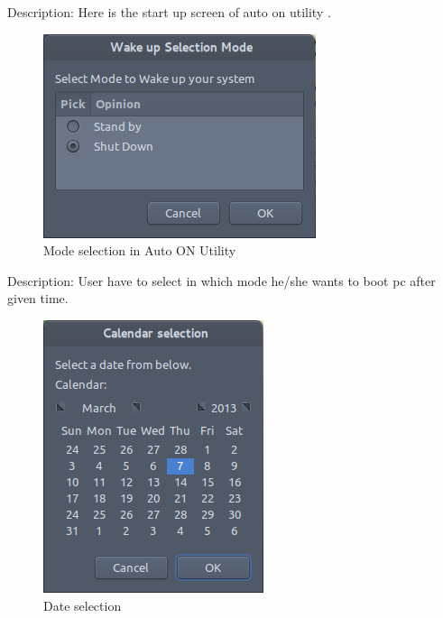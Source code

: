 Description: Here is the start up screen of auto on utility .
\begin{figure}[h]
\begin{center}
  \includegraphics[scale=0.79] {18.png}
  \caption[Screenshot - Mode selection in Auto ON Utility]{Mode selection in Auto ON Utility}
\end{center}
\end{figure}
Description: User have to select in which mode he/she wants to boot pc after given time.

\begin{figure}[h]
\begin{center}
  \includegraphics[scale=0.79] {19.png}
  \caption[Screenshot - Date Selection]{Date selection}
\end{center}
\end{figure}

